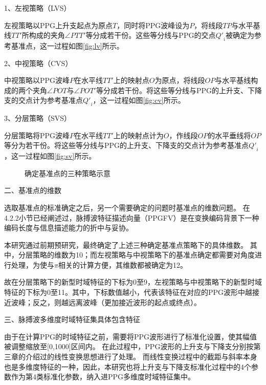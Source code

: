 1、左视策略（LVS）

左视策略以PPG上升支起点为原点$T$，同时将PPG波峰设为$P$，将线段$TP$与水平基线$TT'$所构成的夹角$\angle PTT'$等分成若干份。这些等分线与PPG的交点${Q'}_i$被确定为参考基准点，这一过程如图\autoref{fig:lv}所示。

2、中视策略（CVS）

中视策略以PPG波峰$P$在水平线$TT'$上的映射点$O$为原点，将线段$OP$与水平基线构成的两个夹角$\angle POT$与$\angle POT'$等分成若干份。将这些等分线与PPG的上升支、下降支的交点计为参考基准点${Q'}_i$，这一过程如图\autoref{fig:cv}所示。

3、分层策略（SVS）

分层策略将PPG波峰$P$在水平线$TT'$上的映射点计为$O$，作线段$OP$的水平垂线将$OP$等分为若干份。将这些等分线与PPG的上升支、下降支的交点计为参考基准点${Q'}_i$，这一过程如图\autoref{fig:sv}所示。

\begin{figure}[htbp]
  \centering
  \quad
  \quad
  \caption{\label{fig:all_views}确定基准点的三种策略示意}
\end{figure}

二、基准点的维数

选取基准点的标准确定之后，另一个需要确定的问题时基准点的维数问题。
在4.2.2小节已经阐述过，脉搏波特征描述向量（PPGFV）是在变换编码背景下一种编码长度与信息描述能力的折中与妥协。

本研究通过前期预研究，最终确定了上述三种确定基准点策略下的具体维数。
其中，分层策略的维数为10；而左视策略与中视策略下的基准点确定都需要对角度进行处理，为使与$\pi$相关的计算方便，其维数都被确定为12。

故在分层策略下的新型时域特征的下标为0至9，左视策略与中视策略下的新型时域特征的下标为0至11。其中，下标数值越小，代表该特征在对应的PPG波形中越接近波峰；反之，则越远离波峰（更加接近波形的起点或终点）。

三、脉搏波多维度时域特征集具体包含特征

由于在计算PPG的时域特征之前，需要将PPG波形进行了标准化设置，使其幅值被调整缩放至[0,1000]区间内。
在此过程中，PPG波形的上升支与下降支分别按第三章的介绍过的线性变换思想进行了处理。
而线性变换过程中的截距与斜率本身也是多维度特征的一种，因此，本研究也将上升支与下降支标准化过程中的4个参数作为第4类标准化参数，纳入进PPG多维度时域特征集中。

